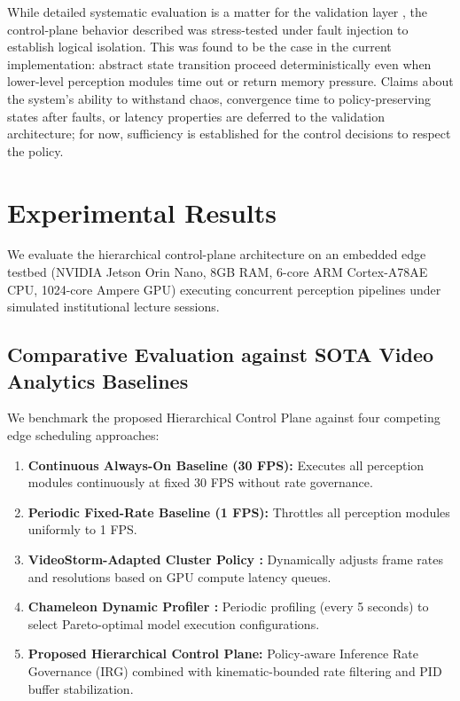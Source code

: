 \documentclass[conference]{IEEEtran}
\begin{document}
While detailed systematic evaluation is a matter for the validation layer \cite{b28}, the control-plane behavior described was stress-tested under fault injection to establish logical isolation. This was found to be the case in the current implementation: abstract state transition proceed deterministically even when lower-level perception modules time out or return memory pressure. Claims about the system’s ability to withstand chaos, convergence time to policy-preserving states after faults, or latency properties are deferred to the validation architecture; for now, sufficiency is established for the control decisions to respect the policy.

\section{Experimental Results}

We evaluate the hierarchical control-plane architecture on an embedded edge testbed (NVIDIA Jetson Orin Nano, 8GB RAM, 6-core ARM Cortex-A78AE CPU, 1024-core Ampere GPU) executing concurrent perception pipelines under simulated institutional lecture sessions.

\subsection{Comparative Evaluation against SOTA Video Analytics Baselines}
We benchmark the proposed Hierarchical Control Plane against four competing edge scheduling approaches:
\begin{enumerate}
    \item \textbf{Continuous Always-On Baseline (30 FPS):} Executes all perception modules continuously at fixed 30 FPS without rate governance.
    \item \textbf{Periodic Fixed-Rate Baseline (1 FPS):} Throttles all perception modules uniformly to 1 FPS.
    \item \textbf{VideoStorm-Adapted Cluster Policy \cite{b33}:} Dynamically adjusts frame rates and resolutions based on GPU compute latency queues.
    \item \textbf{Chameleon Dynamic Profiler \cite{b34}:} Periodic profiling (every 5 seconds) to select Pareto-optimal model execution configurations.
    \item \textbf{Proposed Hierarchical Control Plane:} Policy-aware Inference Rate Governance (IRG) combined with kinematic-bounded rate filtering and PID buffer stabilization.
\end{enumerate}
\end{document}
